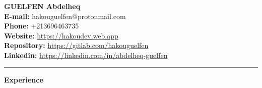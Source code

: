 \documentclass[a4paper,portrait]{article}
\begin{document}
\begin{minipage}{1\textwidth}
    \begin{flushleft}
        \textbf{GUELFEN Abdelheq} \\
        \textbf{E-mail:} hakouguelfen@protonmail.com \\
        \textbf{Phone:} +213696463735 \\
        \textbf{Website:} \url{https://hakoudev.web.app} \\
        \textbf{Repository:} \url{https://gitlab.com/hakouguelfen} \\
        \textbf{Linkedin:} \url{https://linkedin.com/in/abdelheq-guelfen}
    \end{flushleft}
\end{minipage}

\rule{\linewidth}{1pt} %


\begin{minipage}[t]{\linewidth}
  \textbf{Experience}
\end{minipage}
\end{document}
